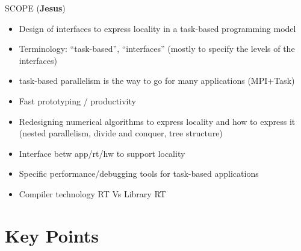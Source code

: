 SCOPE (\textbf{Jesus})
	\begin{itemize}
		\item Design of interfaces to express
		      locality in a task-based programming model
		\item Terminology: ``task-based'', ``interfaces'' (mostly to specify the levels of the interfaces)
		\item task-based parallelism is the way to go for many applications (MPI+Task)
		\item Fast prototyping / productivity
		\item Redesigning numerical algorithms to express locality
		and how to express it (nested parallelism, divide and conquer, tree structure)
		\item Interface betw app/rt/hw to support locality
		\item Specific performance/debugging tools for task-based applications
		\item Compiler technology RT Vs Library RT
	\end{itemize}
	
	
	
\section{Key Points}


